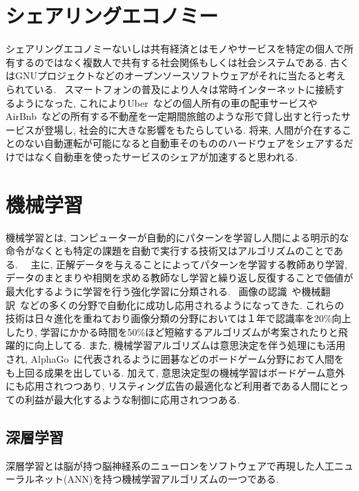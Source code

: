 \section{シェアリングエコノミー}

シェアリングエコノミー\cite{Sharing}ないしは共有経済とはモノやサービスを特定の個人で所有するのではなく複数人で共有する社会関係もしくは社会システムである.
古くはGNUプロジェクトなどのオープンソースソフトウェアがそれに当たると考えられている.~\cite{GNU}
スマートフォンの普及により人々は常時インターネットに接続するようになった, これによりUber~\cite{Uber}などの個人所有の車の配車サービスやAirBnb~\cite{AirBnB}などの所有する不動産を一定期間旅館のような形で貸し出すと行ったサービスが登場し,
社会的に大きな影響をもたらしている.
将来, 人間が介在することのない自動運転が可能になると自動車そのもののハードウェアをシェアするだけではなく自動車を使ったサービスのシェアが加速すると思われる.


\section{機械学習}

機械学習とは, コンピューターが自動的にパターンを学習し人間による明示的な命令がなくとも特定の課題を自動で実行する技術又はアルゴリズムのことである.~\cite{MachineLearning}~\cite{MachineLearning2}
主に, 正解データを与えることによってパターンを学習する教師あり学習,
データのまとまりや相関を求める教師なし学習と繰り返し反復することで価値が最大化するように学習を行う強化学習に分類される.~\cite{MLBasics}
画像の認識~\cite{ImageRecognization}や機械翻訳~\cite{Translation}などの多くの分野で自動化に成功し応用されるようになってきた.
これらの技術は日々進化を重ねており画像分類の分野においては１年で認識率を20\%向上したり, 学習にかかる時間を50\%ほど短縮するアルゴリズムが考案されたりと飛躍的に向上してる.
また, 機械学習アルゴリズムは意思決定を伴う処理にも活用され, AlphaGo~\cite{AlphaGo}に代表されるように囲碁などのボードゲーム分野におて人間をも上回る成果を出している.
加えて, 意思決定型の機械学習はボードゲーム意外にも応用されつつあり, リスティング広告の最適化など利用者である人間にとっての利益が最大化するような制御に応用されつつある.
 

\subsection{深層学習}

深層学習とは脳が持つ脳神経系のニューロンをソフトウェアで再現した人工ニューラルネット(ANN)を持つ機械学習アルゴリズムの一つである.

